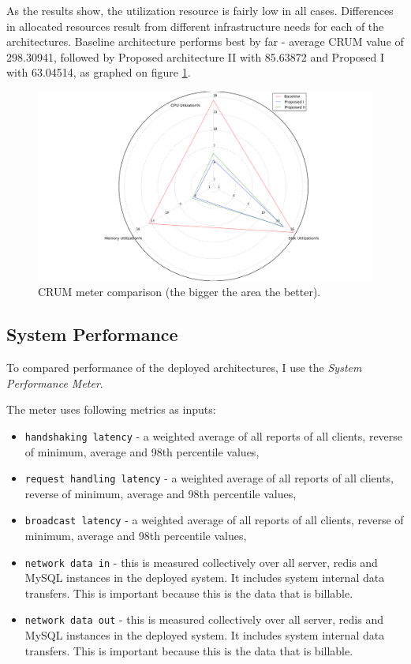 \documentclass{uvamscse}
\begin{document}
As the results show, the utilization resource is fairly low in all cases. Differences in allocated resources result from different infrastructure needs for each of the architectures. Baseline architecture performs best by far - average CRUM value of 298.30941, followed by Proposed architecture II with 85.63872 and Proposed I with 63.04514, as graphed on figure \ref{figure:crum}.

\begin{figure}[H]
\centering
\includegraphics[scale=0.3]{crum}
\caption{CRUM meter comparison (the bigger the area the better).}
\label{figure:crum}
\end{figure}

\subsection{System Performance}
To compared performance of the deployed architectures, I use the \textit{System Performance Meter}.

The meter uses following metrics as inputs:
\begin{itemize}
  \item \texttt{handshaking latency} - a weighted average of all reports of all clients, reverse of minimum, average and 98th percentile values,
  \item \texttt{request handling latency} - a weighted average of all reports of all clients, reverse of minimum, average and 98th percentile values,
  \item \texttt{broadcast latency} - a weighted average of all reports of all clients, reverse of minimum, average and 98th percentile values,
  \item \texttt{network data in} - this is measured collectively over all server, redis and MySQL instances in the deployed system. It includes system internal data transfers. This is important because this is the data that is billable.
  \item \texttt{network data out} - this is measured collectively over all server, redis and MySQL instances in the deployed system. It includes system internal data transfers. This is important because this is the data that is billable.
\end{itemize}
\end{document}
